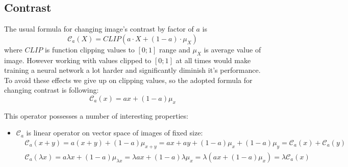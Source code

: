     \subsection{Contrast}
    \newcommand\mcc{\mathcal{C}}
    {\color{blue} 
        The usual formula for changing image's contrast by factor of $a$ is
        $$ \mathcal{C}_a(X) = \mathit{CLIP}\left(a\cdot X + (1-a) \cdot \mu_X\right) $$
        where $\mathit{CLIP}$ is function clipping values to $\left[0;1\right]$ range
        and $\mu_X$ is average value of image. However working with values clipped
        to $\left[0;1\right]$ at all times would make training a neural network
        a lot harder and significantly diminish it's performance. To avoid these effects
        we give up on clipping values, so the adopted formula for changing contrast is following:
        \begin{equation}
            \label{contrast}
            \mathcal{C}_a(x) = a x + (1-a) \mu_x
        \end{equation}

        This operator possesses a number of interesting properties:
        \begin{itemize}
            \item $\mathcal{C}_a$ is linear operator on vector space of images of fixed size:
                \begin{align*}
                    & \mathcal{C}_a(x+y) = 
                    a(x+y) + (1-a)\mu_{x+y} = 
                    ax + ay +(1-a)\mu_x +(1-a)\mu_y = 
                \mathcal{C}_a(x) + \mathcal{C}_a(y) \\
                    & \mathcal{C}_a(\lambda x) = a\lambda x + (1-a)\mu_{\lambda x} = 
                    \lambda ax + (1-a)\lambda\mu_x = \lambda(ax + (1-a)\mu_x) = 
                    \lambda \mathcal{C}_a(x)
                \end{align*}


\end{itemize}}
